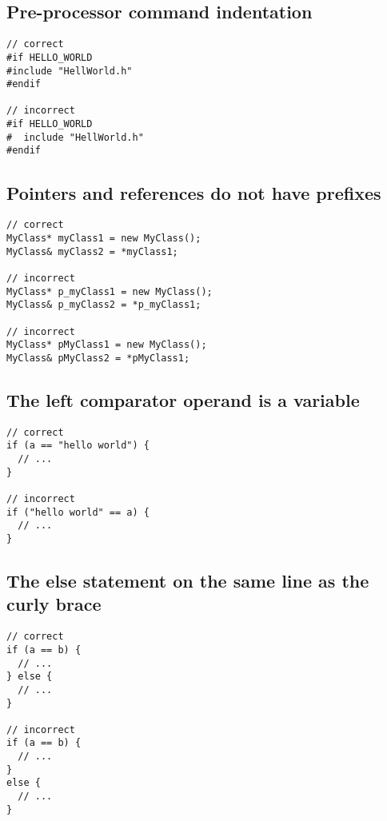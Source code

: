 \documentclass{article}
\begin{document}
\subsection{Pre-processor command indentation}

\begin{verbatim}
// correct
#if HELLO_WORLD
#include "HellWorld.h"
#endif

// incorrect
#if HELLO_WORLD
#  include "HellWorld.h"
#endif
\end{verbatim}

\subsection{Pointers and references do not have prefixes}

\begin{verbatim}
// correct
MyClass* myClass1 = new MyClass();
MyClass& myClass2 = *myClass1;

// incorrect
MyClass* p_myClass1 = new MyClass();
MyClass& p_myClass2 = *p_myClass1;

// incorrect
MyClass* pMyClass1 = new MyClass();
MyClass& pMyClass2 = *pMyClass1;
\end{verbatim}

\subsection{The left comparator operand is a variable}

\begin{verbatim}
// correct
if (a == "hello world") {
  // ...
}

// incorrect
if ("hello world" == a) {
  // ...
}
\end{verbatim}

\subsection{The else statement on the same line as the curly brace}

\begin{verbatim}
// correct
if (a == b) {
  // ...
} else {
  // ...
}

// incorrect
if (a == b) {
  // ...
}
else {
  // ...
}
\end{verbatim}
\end{document}
